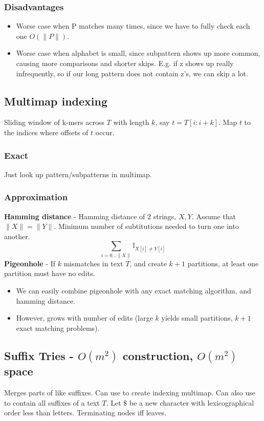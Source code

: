\documentclass{article}
\begin{document}
\subsubsection{Disadvantages}
\begin{itemize}
    \itemsep 0em
    \item Worse case when P matches many times, since we have to fully check each one $O(\|P\|)$.
    \item Worse case when alphabet is small, since subpattern shows up more common, causing more comparisons and shorter skips. E.g. if z shows up really infrequently, so if our long pattern does not contain z's, we can skip a lot.
\end{itemize}

\subsection{Multimap indexing}
Sliding window of k-mers across $T$ with length $k$, say $t=T[i:i+k]$. Map $t$ to the indices where offsets of $t$ occur.
\subsubsection{Exact}
Just look up pattern/subpatterns in multimap.
\subsubsection{Approximation}
\textbf{Hamming distance} - Hamming distance of 2 strings, $X, Y$. Assume that $\|X\|=\|Y\|$. Minimum number of subtitutions needed to turn one into another.
$$\sum_{i=0\ldots \|X\|}\mathbb{I}_{X[i] \neq Y[i]}$$
\textbf{Pigeonhole} - If $k$ mismatches in text $T$, and create $k+1$ partitions, at least one partition must have no edits.
\begin{itemize}
    \itemsep 0em
    \item We can easily combine pigeonhole with any exact matching algorithm, and hamming distance.
    \item However, grows with number of edits (large $k$ yields small partitions, $k+1$ exact matching problems).
\end{itemize}

\subsection{Suffix Tries - $O(m^2)$ construction, $O(m^2)$ space}
Merges parts of like suffixes. Can use to create indexing multimap. Can also use to contain all suffixes of a text $T$. Let $\$$ be a new character with lexicographical order less than letters. Terminating nodes iff leaves.
\end{document}
